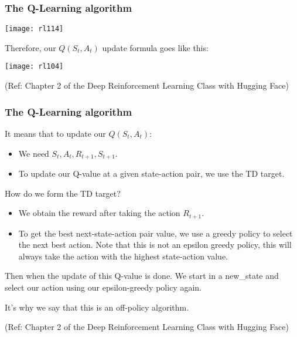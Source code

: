 \begin{frame}[fragile]\frametitle{The Q-Learning algorithm}


\begin{center}
\texttt{[image: rl114]}
\end{center}

Therefore, our $Q(S_t, A_t)$ update formula goes like this:

\begin{center}
\texttt{[image: rl104]}
\end{center}

 
{\tiny (Ref: Chapter 2 of the Deep Reinforcement Learning Class with Hugging Face)}

\end{frame}

\begin{frame}[fragile]\frametitle{The Q-Learning algorithm}

It means that to update our $Q(S_t, A_t)$:
\begin{itemize}
\item We need $S_t, A_t, R_{t+1}, S_{t+1}$.
\item To update our Q-value at a given state-action pair, we use the TD target.
\end{itemize}

How do we form the TD target?

\begin{itemize}
\item We obtain the reward after taking the action $R_{t+1}$.
\item To get the best next-state-action pair value, we use a greedy policy to select the next best action. Note that this is not an epsilon greedy policy, this will always take the action with the highest state-action value.
\end{itemize}

Then when the update of this Q-value is done. We start in a new\_state and select our action using our epsilon-greedy policy again.

It's why we say that this is an off-policy algorithm.

 
{\tiny (Ref: Chapter 2 of the Deep Reinforcement Learning Class with Hugging Face)}

\end{frame}

